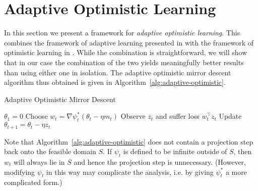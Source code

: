 \documentclass[paper_icml.tex]{subfiles}
\begin{document}
\section{Adaptive Optimistic Learning} 
\label{sec:machinery}
In this section we present a framework for \emph{adaptive optimistic learning}. 
This combines the framework of adaptive learning presented in \cite{orabona2013general} with 
the framework of optimistic learning in \cite{rakhlin2012}. While the combination is 
straightforward, we will show that in our case the combination of the two yields meaningfully 
better results than using either one in isolation. The adaptive optimistic mirror descent 
algorithm thus obtained is given in Algorithm~\ref{alg:adaptive-optimistic}.

\begin{algorithm}
\caption{Adaptive Optimistic Mirror Descent}
\label{alg:adaptive-optimistic}
\begin{algorithmic}
\STATE $\theta_1 = 0$
  \STATE Choose $w_t = \nabla \psi_t^*(\theta_t - \eta m_t)$
  \STATE Observe $z_t$ and suffer loss $w_t^{\top}z_t$
  \STATE Update $\theta_{t+1} = \theta_t - \eta z_t$
\ENDFOR
\end{algorithmic}
\end{algorithm}
Note that Algorithm~\ref{alg:adaptive-optimistic} does not contain a 
projection step back onto the feasible domain $S$. If $\psi_t$ is defined to be 
infinite outside of $S$, then $w_t$ will always lie in $S$ and hence the 
projection step is unnecessary. (However, modifying $\psi_t$ in this way may 
complicate the analysis, i.e. by giving $\psi_t^*$ a more complicated form.)
\end{document}
